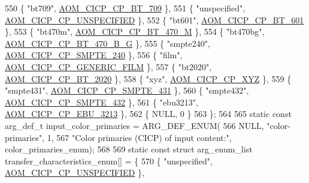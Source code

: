 \begin{DoxyCodeInclude}
{{{{{{{550     \{ \textcolor{stringliteral}{"bt709"}, \hyperlink{aom__image_8h_a5267ad095a088ece3499336812503cefa9a2ebe055c0508a2a2f72b6c192fcce9}{AOM\_CICP\_CP\_BT\_709} \},
551     \{ \textcolor{stringliteral}{"unspecified"}, \hyperlink{aom__image_8h_a5267ad095a088ece3499336812503cefa0835a3af8e6ffc6df298b6e64f878431}{AOM\_CICP\_CP\_UNSPECIFIED} \},
552     \{ \textcolor{stringliteral}{"bt601"}, \hyperlink{aom__image_8h_a5267ad095a088ece3499336812503cefa3ce81eb125550ec2f11a58f183eeaee6}{AOM\_CICP\_CP\_BT\_601} \},
553     \{ \textcolor{stringliteral}{"bt470m"}, \hyperlink{aom__image_8h_a5267ad095a088ece3499336812503cefa5b57cb26f04f4df6585335129392d5e2}{AOM\_CICP\_CP\_BT\_470\_M} \},
554     \{ \textcolor{stringliteral}{"bt470bg"}, \hyperlink{aom__image_8h_a5267ad095a088ece3499336812503cefa8b33dc8483c16048c606d75d9f11e38a}{AOM\_CICP\_CP\_BT\_470\_B\_G} \},
555     \{ \textcolor{stringliteral}{"smpte240"}, \hyperlink{aom__image_8h_a5267ad095a088ece3499336812503cefa1a8b2e5694489121f80a406d9da25dfb}{AOM\_CICP\_CP\_SMPTE\_240} \},
556     \{ \textcolor{stringliteral}{"film"}, \hyperlink{aom__image_8h_a5267ad095a088ece3499336812503cefa8dd6ba5106c22d149a233e73232aeb65}{AOM\_CICP\_CP\_GENERIC\_FILM} \},
557     \{ \textcolor{stringliteral}{"bt2020"}, \hyperlink{aom__image_8h_a5267ad095a088ece3499336812503cefa6bb95baf09cd6e1f3596b459712c592a}{AOM\_CICP\_CP\_BT\_2020} \},
558     \{ \textcolor{stringliteral}{"xyz"}, \hyperlink{aom__image_8h_a5267ad095a088ece3499336812503cefa6032cae72a729933a6a75e3b943a542c}{AOM\_CICP\_CP\_XYZ} \},
559     \{ \textcolor{stringliteral}{"smpte431"}, \hyperlink{aom__image_8h_a5267ad095a088ece3499336812503cefa54d519c9ac0ca52ebda7caf736530e57}{AOM\_CICP\_CP\_SMPTE\_431} \},
560     \{ \textcolor{stringliteral}{"smpte432"}, \hyperlink{aom__image_8h_a5267ad095a088ece3499336812503cefa227b6e4116ed0266af20b705aebaf661}{AOM\_CICP\_CP\_SMPTE\_432} \},
561     \{ \textcolor{stringliteral}{"ebu3213"}, \hyperlink{aom__image_8h_a5267ad095a088ece3499336812503cefa9e74dcb338953bfab3101aa33ea44157}{AOM\_CICP\_CP\_EBU\_3213} \},
562     \{ NULL, 0 \}
563 \};
564 
565 \textcolor{keyword}{static} \textcolor{keyword}{const} arg\_def\_t input\_color\_primaries = ARG\_DEF\_ENUM(
566     NULL, \textcolor{stringliteral}{"color-primaries"}, 1,
567     \textcolor{stringliteral}{"Color primaries (CICP) of input content:"}, color\_primaries\_enum);
568 
569 \textcolor{keyword}{static} \textcolor{keyword}{const} \textcolor{keyword}{struct }arg\_enum\_list transfer\_characteristics\_enum[] = \{
570     \{ \textcolor{stringliteral}{"unspecified"}, \hyperlink{aom__image_8h_a5267ad095a088ece3499336812503cefa0835a3af8e6ffc6df298b6e64f878431}{AOM\_CICP\_CP\_UNSPECIFIED} \},
}}}}}}}
\end{DoxyCodeInclude}
